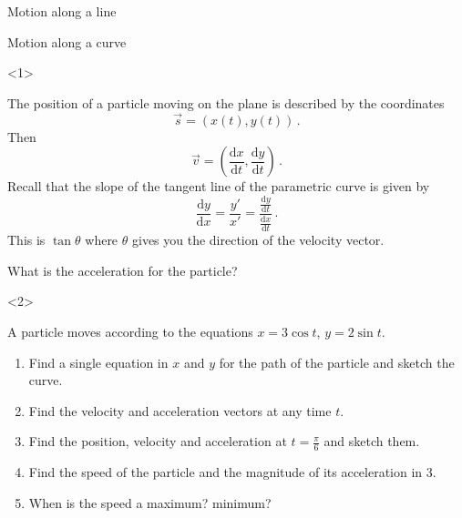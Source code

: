 \begin{frame}{Motion along a line}
\begin{onlyenv}
\begin{example}
\end{example}

\end{onlyenv}

\end{frame}

\begin{frame}{Motion along a curve}

\begin{onlyenv}<1>


The position of a particle moving on the plane is described by the
coordinates
\[
\vec{s}=\left(x\left(t\right),y\left(t\right)\right)\,.
\]
Then
\[
\vec{v}=\left(\frac{\mathrm{d}x}{\mathrm{d}t},\frac{\mathrm{d}y}{\mathrm{d}t}\right)\,.
\]
Recall that the slope of the tangent line of the parametric curve
is given by
\[
\frac{\mathrm{d}y}{\mathrm{d}x}=\frac{y'}{x'}=\frac{\frac{\mathrm{d}y}{\mathrm{d}t}}{\frac{\mathrm{d}x}{\mathrm{d}t}}\,.
\]
This is $\tan\theta$ where $\theta$ gives you the direction of the
velocity vector.


\alert{What is the acceleration for the particle? }

\end{onlyenv}



\begin{onlyenv}<2>

\begin{example}
A particle moves according to the equations $x=3\cos t$, $y=2\sin t$.
\begin{enumerate}
\item Find a single equation in $x$ and $y$ for the path of the particle
and sketch the curve.
\item Find the velocity and acceleration vectors at any time $t$.
\item Find the position, velocity and acceleration at $t=\frac{\pi}{6}$
and sketch them.
\item Find the speed of the particle and the magnitude of its acceleration
in 3.
\item When is the speed a maximum? minimum?
\end{enumerate}

\end{example}

\end{onlyenv}

\end{frame}

